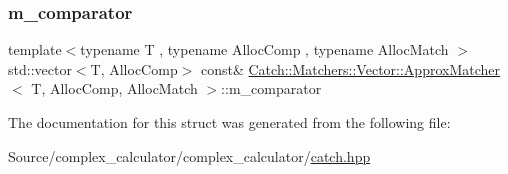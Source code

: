 \mbox{\label{struct_catch_1_1_matchers_1_1_vector_1_1_approx_matcher_a482a43ccf47697830d23bf0beaf06b9b}} 
\subsubsection{\texorpdfstring{m\+\_\+comparator}{m\_comparator}}
{\footnotesize\ttfamily template$<$typename T , typename Alloc\+Comp , typename Alloc\+Match $>$ \\
std\+::vector$<$T, Alloc\+Comp$>$ const\& \mbox{\hyperlink{struct_catch_1_1_matchers_1_1_vector_1_1_approx_matcher}{Catch\+::\+Matchers\+::\+Vector\+::\+Approx\+Matcher}}$<$ T, Alloc\+Comp, Alloc\+Match $>$\+::m\+\_\+comparator}



The documentation for this struct was generated from the following file\+:\begin{DoxyCompactItemize}
\item 
Source/complex\+\_\+calculator/complex\+\_\+calculator/\mbox{\hyperlink{catch_8hpp}{catch.\+hpp}}\end{DoxyCompactItemize}
